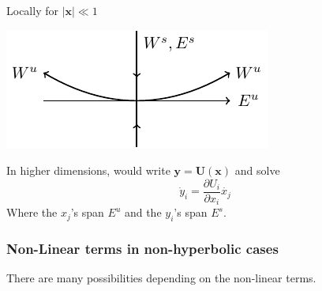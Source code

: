 \documentclass{article}
\begin{document}
Locally for $|\bm{x}| \ll 1$ \\
\begin{center}
\includegraphics{Fig18.pdf}
\end{center}
In higher dimensions, would write $\bm{y} = \bm{U}(\bm{x})$ and solve
\[ \dot{y}_i = \frac{\partial U_i}{\partial x_i} \dot{x_j} \]
Where the $x_j$'s span $E^u$ and the $y_i$'s span $E^s$.
\subsubsection{Non-Linear terms in non-hyperbolic cases}
There are many possibilities depending on the non-linear terms.
\end{document}
